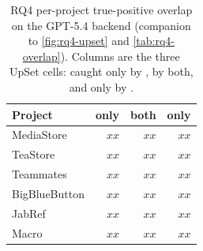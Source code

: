 %
\begin{table}[t]
\caption{RQ4 per-project true-positive overlap on the GPT-5.4 backend (companion to \autoref{fig:rq4-upset} and \autoref{tab:rq4-overlap}). Columns are the three UpSet cells: caught only by \linkerB{}, by both, and only by \linkerC{}.}
\label{tab:rq4-perproject}
\centering\small
\begin{tabular}{@{}lrrr@{}}
\toprule
Project & only \linkerB{} & both & only \linkerC{} \\
\midrule
MediaStore    & $xx$ & $xx$ & $xx$ \\
TeaStore      & $xx$ & $xx$ & $xx$ \\
Teammates     & $xx$ & $xx$ & $xx$ \\
BigBlueButton & $xx$ & $xx$ & $xx$ \\
JabRef        & $xx$ & $xx$ & $xx$ \\
\midrule
Macro         & $xx$ & $xx$ & $xx$ \\
\bottomrule
\end{tabular}
\end{table}
